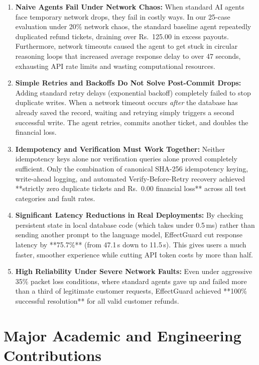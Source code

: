 \begin{enumerate}
    \item \textbf{Naive Agents Fail Under Network Chaos:}
    When standard AI agents face temporary network drops, they fail in costly ways. In our 25-case evaluation under 20\% network chaos, the standard baseline agent repeatedly duplicated refund tickets, draining over Rs.~125.00 in excess payouts. Furthermore, network timeouts caused the agent to get stuck in circular reasoning loops that increased average response delay to over 47 seconds, exhausting API rate limits and wasting computational resources.

    \item \textbf{Simple Retries and Backoffs Do Not Solve Post-Commit Drops:}
    Adding standard retry delays (exponential backoff) completely failed to stop duplicate writes. When a network timeout occurs \textit{after} the database has already saved the record, waiting and retrying simply triggers a second successful write. The agent retries, commits another ticket, and doubles the financial loss.

    \item \textbf{Idempotency and Verification Must Work Together:}
    Neither idempotency keys alone nor verification queries alone proved completely sufficient. Only the combination of canonical SHA-256 idempotency keying, write-ahead logging, and automated Verify-Before-Retry recovery achieved **strictly zero duplicate tickets and Rs.~0.00 financial loss** across all test categories and fault rates.

    \item \textbf{Significant Latency Reductions in Real Deployments:}
    By checking persistent state in local database code (which takes under 0.5\,ms) rather than sending another prompt to the language model, EffectGuard cut response latency by **75.7\%** (from 47.1\,s down to 11.5\,s). This gives users a much faster, smoother experience while cutting API token costs by more than half.

    \item \textbf{High Reliability Under Severe Network Faults:}
    Even under aggressive 35\% packet loss conditions, where standard agents gave up and failed more than a third of legitimate customer requests, EffectGuard achieved **100\% successful resolution** for all valid customer refunds.
\end{enumerate}

\section{Major Academic and Engineering Contributions}

